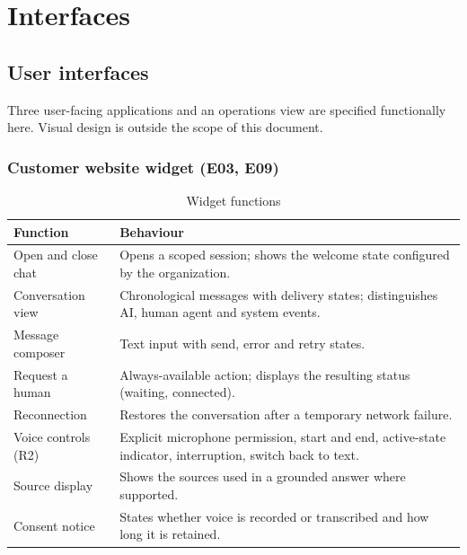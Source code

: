 \chapter{Interfaces}

\section{User interfaces}
Three user-facing applications and an operations view are specified functionally here. Visual design is outside the scope of this document.

\subsection{Customer website widget (E03, E09)}
\begin{table}[htbp]
\centering\caption{Widget functions}\label{tab:widget}
\begin{tabular}{@{}p{4.2cm}p{11.8cm}@{}}
\toprule \textbf{Function} & \textbf{Behaviour} \\ \midrule
Open and close chat & Opens a scoped session; shows the welcome state configured by the organization. \\
Conversation view & Chronological messages with delivery states; distinguishes AI, human agent and system events. \\
Message composer & Text input with send, error and retry states. \\
Request a human & Always-available action; displays the resulting status (waiting, connected). \\
Reconnection & Restores the conversation after a temporary network failure. \\
Voice controls (R2) & Explicit microphone permission, start and end, active-state indicator, interruption, switch back to text. \\
Source display & Shows the sources used in a grounded answer where supported. \\
Consent notice & States whether voice is recorded or transcribed and how long it is retained. \\
\bottomrule
\end{tabular}
\end{table}

